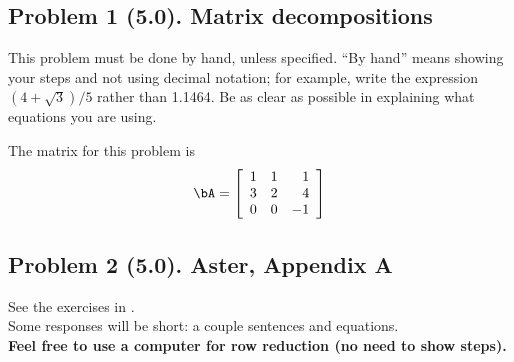 \documentclass[11pt,titlepage,fleqn]{article}
\begin{document}

\subsection*{Problem 1 (5.0). Matrix decompositions}

This problem must be done by hand, unless specified. ``By hand'' means showing your steps and not using decimal notation; for example, write the expression $(4 +\sqrt{3})/5$ rather than 1.1464.
Be as clear as possible in explaining what equations you are using.

\medskip\noindent
The matrix for this problem is
%
\begin{equation*}
\bA =  \left[ \begin{array}{rrr}
     1  &   1  &   1 \\
     3  &   2  &   4 \\
     0  &   0  &  -1 \\
\end{array} \right]
\end{equation*}




\subsection*{Problem 2 (5.0). Aster, Appendix A}

See the exercises in \citet[][Section A.12]{Aster}. \\ 
Some responses will be short: a couple sentences and equations. \\
{\bf Feel free to use a computer for row reduction (no need to show steps).}
\end{document}
